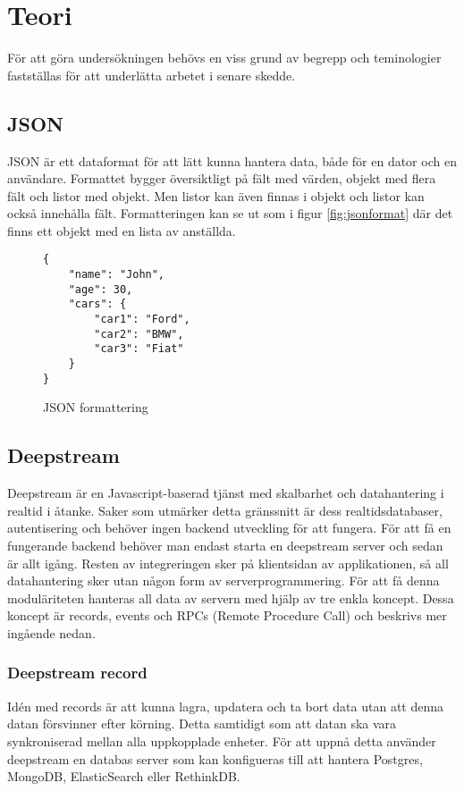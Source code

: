 \section{Teori}

\label{sec:tim-theory}
För att göra undersökningen behövs en viss grund av begrepp och teminologier fastställas för att underlätta arbetet i senare skedde.

\subsection{JSON}
JSON\cite{json} är ett dataformat för att lätt kunna hantera data, både för en dator och en användare. Formattet bygger översiktligt på fält med värden, objekt med flera fält och listor med objekt. Men listor kan även finnas i objekt och listor kan också innehålla fält. Formatteringen kan se ut som i figur \ref{fig:jsonformat} där det finns ett objekt med en lista av anställda.

\lstset{language=Java}
\begin{figure}[h]
  \begin{minipage}[c]{5cm}
    \begin{lstlisting}
{
    "name": "John",
    "age": 30,
    "cars": {
        "car1": "Ford",
        "car2": "BMW",
        "car3": "Fiat"
    }
} 
    \end{lstlisting}
  \caption{JSON formattering}
  \label{fig:tim-jsonformat}
  \end{minipage}
\end{figure}

\subsection{Deepstream}
\label{subsec:tim-deepstream}
Deepstream är en Javascript-baserad tjänst med skalbarhet och datahantering i realtid i åtanke. Saker som utmärker detta gränssnitt är dess realtidsdatabaser, autentisering och behöver ingen backend utveckling för att fungera. För att få en fungerande backend behöver man endast starta en deepstream server och sedan är allt igång. Resten av integreringen sker på klientsidan av applikationen, så all datahantering sker utan någon form av serverprogrammering. För att få denna moduläriteten hanteras all data av servern med hjälp av tre enkla koncept. Dessa koncept är records, events och RPCs (Remote Procedure Call) och beskrivs mer ingående nedan. 

\subsubsection{Deepstream record}
Idén med records är att kunna lagra, updatera och ta bort data utan att denna datan försvinner efter körning. Detta samtidigt som att datan ska vara synkroniserad mellan alla uppkopplade enheter. För att uppnå detta använder deepstream en databas server som kan konfigueras till att hantera Postgres, MongoDB, ElasticSearch eller RethinkDB. 

